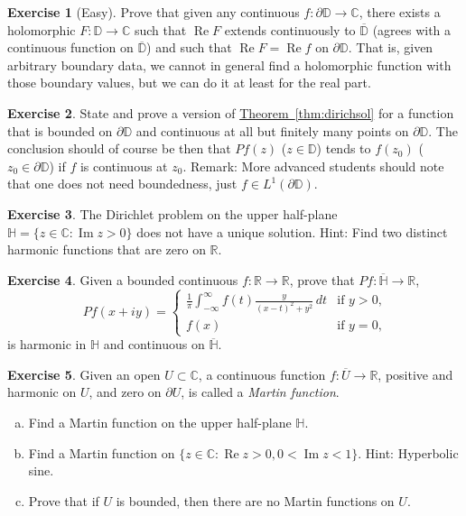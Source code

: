 \documentclass[12pt,openany]{book}
\newcommand{\widebar}[1]{\overline{#1}}
\renewcommand{\Re}{\operatorname{Re}}
\renewcommand{\Im}{\operatorname{Im}}
\newcommand{\C}{{\mathbb{C}}}
\newcommand{\R}{{\mathbb{R}}}
\newcommand{\D}{{\mathbb{D}}}
\newcommand{\bH}{{\mathbb{H}}}
\newcommand{\myindex}[1]{#1\index{#1}}
\theoremstyle{plain}
\theoremstyle{remark}
\theoremstyle{definition}
\newenvironment{exbox}{%
    \def\FrameCommand{\vrule width 1pt \relax\hspace{10pt}}%
    \MakeFramed{\advance\hsize-\width\FrameRestore}%
}{%
    \endMakeFramed
}
\newenvironment{exparts}{%
    \leavevmode\begin{enumerate}[a),noitemsep,topsep=0pt,parsep=0pt,partopsep=0pt]
}{%
    \end{enumerate}
}
\theoremstyle{exercise}
\newtheorem{exercise}{Exercise}[section]
\theoremstyle{example}
\newcommand{\thmref}[1]{\hyperref[#1]{Theorem~\ref*{#1}}}
\begin{document}
\begin{exbox}
\begin{exercise}[Easy]
Prove that given any continuous $f \colon \partial \D \to \C$,
there exists a holomorphic $F \colon \D \to \C$ such that $\Re F$ extends
continuously to $\overline{\D}$ (agrees with a continuous function on
$\overline{\D}$) and such that $\Re F = \Re f$ on $\partial \D$.
That is, given arbitrary boundary data, we cannot in general find a
holomorphic function with those boundary values, but we can do it at least
for the real part.
\end{exercise}

\begin{exercise} \label{exercise:dirichDwithsings}
State and prove a version of \thmref{thm:dirichsol} for a function that is
bounded on $\partial \D$ and continuous at all but finitely many points on
$\partial \D$.  The conclusion should of course be then that $Pf(z)$ ($z \in
\D$) tends
to $f(z_0)$ ($z_0 \in \partial \D$) if $f$ is continuous at $z_0$.
Remark: More advanced students should note that one does not need boundedness,
just $f \in L^1(\partial \D)$.
\end{exercise}

\begin{exercise} \label{exercise:upperhalfplanedirichlet}
The Dirichlet problem on the upper half-plane $\bH = \{ z \in \C : \Im z > 0 \}$
does not have a unique solution.  Hint:  Find two distinct
harmonic functions that are zero on $\R$.
\end{exercise}

\begin{exercise}
\pagebreak[2]
Given a bounded continuous $f \colon \R \to \R$, prove that 
$Pf \colon \overline{\bH} \to \R$,
\begin{equation*}
Pf(x+iy)
=
\begin{cases}
\frac{1}{\pi}
\int_{-\infty}^{\infty} f(t) \frac{y}{{(x-t)}^2+y^2} \, dt
&
\text{if $y > 0$,} \\
f(x) & \text{if $y=0$,}
\end{cases}
\end{equation*}
is harmonic in $\bH$ and continuous on $\overline{\bH}$.
\end{exercise}

\begin{exercise}\label{exercise:martinfunctions}
Given an open $U \subset \C$,
a continuous function $f \colon \widebar{U} \to \R$,
positive and harmonic on $U$,
and zero on $\partial U$, is called a
\emph{\myindex{Martin function}}.
\begin{exparts}
\item
Find a Martin function on the upper half-plane $\bH$.
\item
Find a Martin function on $\{ z \in \C : \Re z > 0, 0 < \Im z < 1
\}$.  Hint: Hyperbolic sine.
\item
Prove that if $U$ is bounded, then there are no Martin functions on $U$.
\end{exparts}
\end{exercise}


\end{exbox}
\end{document}
